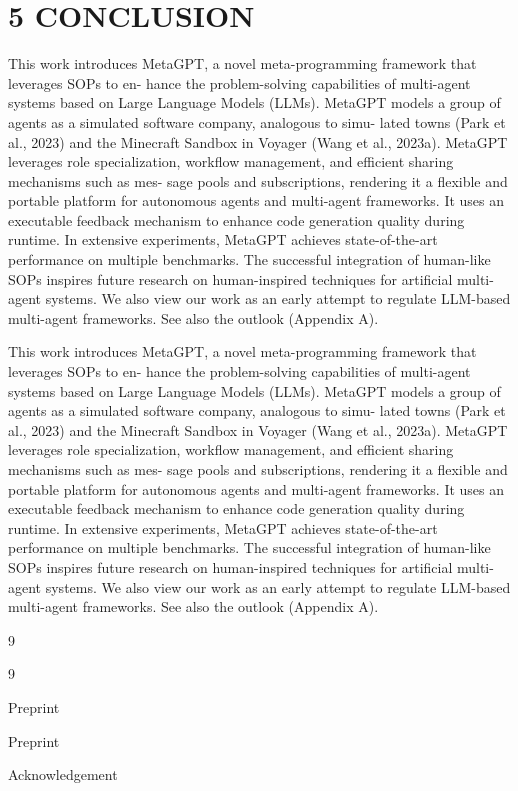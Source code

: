 \documentclass[12pt]{article}
\begin{document}
\section{5 CONCLUSION}


This work introduces MetaGPT, a novel meta-programming framework that leverages SOPs to en-
hance the problem-solving capabilities of multi-agent systems based on Large Language Models
(LLMs). MetaGPT models a group of agents as a simulated software company, analogous to simu-
lated towns (Park et al., 2023) and the Minecraft Sandbox in Voyager (Wang et al., 2023a). MetaGPT
leverages role specialization, workflow management, and efficient sharing mechanisms such as mes-
sage pools and subscriptions, rendering it a flexible and portable platform for autonomous agents
and multi-agent frameworks. It uses an executable feedback mechanism to enhance code generation
quality during runtime. In extensive experiments, MetaGPT achieves state-of-the-art performance
on multiple benchmarks. The successful integration of human-like SOPs inspires future research
on human-inspired techniques for artificial multi-agent systems. We also view our work as an early
attempt to regulate LLM-based multi-agent frameworks. See also the outlook (Appendix A).


This work introduces MetaGPT, a novel meta-programming framework that leverages SOPs to en-
hance the problem-solving capabilities of multi-agent systems based on Large Language Models
(LLMs). MetaGPT models a group of agents as a simulated software company, analogous to simu-
lated towns (Park et al., 2023) and the Minecraft Sandbox in Voyager (Wang et al., 2023a). MetaGPT
leverages role specialization, workflow management, and efficient sharing mechanisms such as mes-
sage pools and subscriptions, rendering it a flexible and portable platform for autonomous agents
and multi-agent frameworks. It uses an executable feedback mechanism to enhance code generation
quality during runtime. In extensive experiments, MetaGPT achieves state-of-the-art performance
on multiple benchmarks. The successful integration of human-like SOPs inspires future research
on human-inspired techniques for artificial multi-agent systems. We also view our work as an early
attempt to regulate LLM-based multi-agent frameworks. See also the outlook (Appendix A).


9


9


Preprint


Preprint


Acknowledgement
\end{document}
